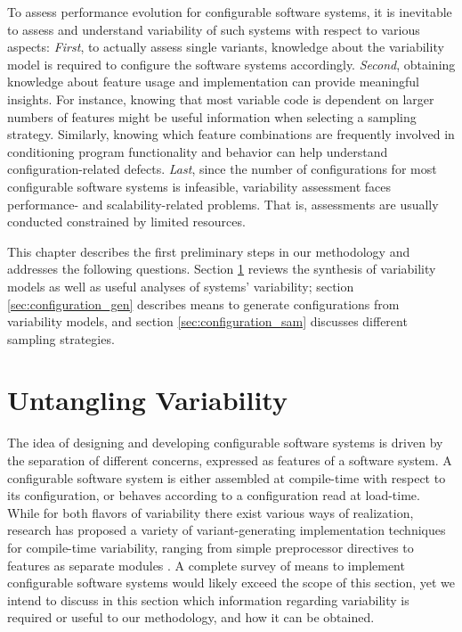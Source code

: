 To assess performance evolution for configurable software systems, it is
inevitable to assess and understand variability of such systems with respect to
various aspects: \emph{First}, to actually assess single variants, knowledge
about the variability model is required to configure the software systems accordingly.
\emph{Second}, obtaining knowledge about feature usage and implementation can
provide meaningful insights. For instance, knowing that most variable code is dependent
on larger numbers of features might be useful information when selecting a
sampling strategy. Similarly, knowing which feature combinations are frequently
involved in conditioning program functionality and behavior can help understand
configuration-related defects. \emph{Last}, since the number of configurations
for most configurable software systems is infeasible, variability assessment faces
performance- and scalability-related problems. That is, assessments are usually
conducted constrained by limited resources.

This chapter describes the first preliminary steps in our methodology and
addresses the following questions. Section \ref{sec:untangling} reviews the synthesis of
variability models as well as useful analyses of systems' variability; section
\ref{sec:configuration_gen} describes means to generate configurations from variability
models, and section \ref{sec:configuration_sam} discusses different sampling
strategies.

\section{Untangling Variability}\label{sec:untangling}
The idea of designing and developing configurable software systems is driven by
the separation of different concerns, expressed as features of a software
system. A configurable software system is either assembled at compile-time with
respect to its configuration, or behaves according to a configuration read at
load-time. While for both flavors of variability there exist various ways of
realization, research has proposed a variety of variant-generating
implementation techniques for compile-time variability, ranging from simple
preprocessor directives to features as separate modules
\citep{kastner_model_2009}.  A complete survey of means to implement
configurable software systems would likely exceed the scope of this section, yet we intend to discuss in this
section which information regarding variability is required or useful to our
methodology, and how it can be obtained.

